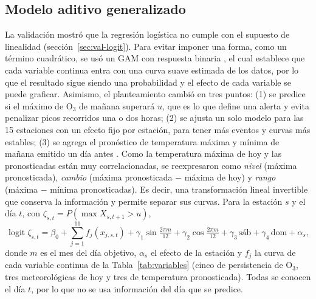 \documentclass[11pt]{article}
\begin{document}
\subsection{Modelo aditivo generalizado}
\label{sec:mod-gam}

La validación mostró que la regresión logística no cumple con el supuesto de linealidad (sección~\ref{sec:val-logit}). Para evitar imponer una forma, como un término cuadrático, se usó un GAM con respuesta binaria \citep{wood2017}, el cual establece que cada variable continua entra con una curva suave estimada de los datos, por lo que el resultado sigue siendo una probabilidad y el efecto de cada variable se puede graficar. Asimismo, el planteamiento cambió en tres puntos: (1) se predice si el máximo de O$_3$ de mañana superará $u$, que es lo que define una alerta y evita penalizar picos recorridos una o dos horas; (2) se ajusta un solo modelo para las 15 estaciones con un efecto fijo por estación, para tener más eventos y curvas más estables; (3) se agrega el pronóstico de temperatura máxima y mínima de mañana emitido un día antes \citep{zippenfenig_open_meteo_2023}. Como la temperatura máxima de hoy y las pronosticadas están muy correlacionadas, se reexpresaron como \emph{nivel} (máxima pronosticada), \emph{cambio} (máxima pronosticada $-$ máxima de hoy) y \emph{rango} (máxima $-$ mínima pronosticadas). Es decir, una transformación lineal invertible que conserva la información y permite separar sus curvas. Para la estación $s$ y el día $t$, con $\zeta_{s,t}=P(\max X_{s,t+1}>u)$,
\begin{equation}
\operatorname{logit}\zeta_{s,t} = \beta_0 + \sum_{j=1}^{11} f_j(x_{j,s,t}) + \gamma_1\sin\tfrac{2\pi m}{12} + \gamma_2\cos\tfrac{2\pi m}{12} + \gamma_3\,\text{sáb} + \gamma_4\,\text{dom} + \alpha_s ,
\label{eq:gam}
\end{equation}
donde $m$ es el mes del día objetivo, $\alpha_s$ el efecto de la estación y $f_j$ la curva de cada variable continua de la Tabla~\ref{tab:variables} (cinco de persistencia de O$_3$, tres meteorológicas de hoy y tres de temperatura pronosticada). Todas se conocen el día $t$, por lo que no se usa información del día que se predice.
\end{document}
